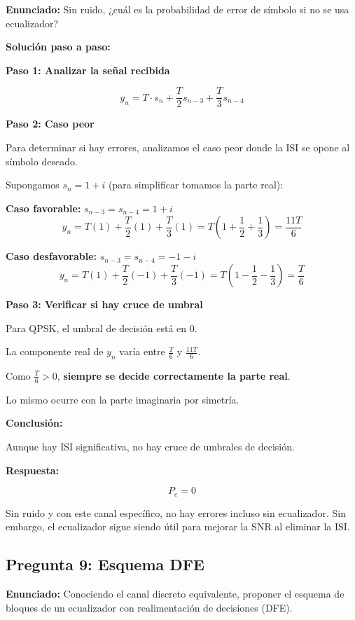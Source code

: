 \documentclass[11pt,a4paper]{article}
\begin{document}
\textbf{Enunciado:} Sin ruido, ¿cu\'al es la probabilidad de error de s\'imbolo si no se usa ecualizador?

\vspace{0.3cm}
\textbf{Soluci\'on paso a paso:}

\textbf{Paso 1: Analizar la se\~nal recibida}

\[
y_n = T \cdot s_n + \frac{T}{2} s_{n-3} + \frac{T}{3} s_{n-4}
\]

\textbf{Paso 2: Caso peor}

Para determinar si hay errores, analizamos el caso peor donde la ISI se opone al s\'imbolo deseado.

Supongamos $s_n = 1 + i$ (para simplificar tomamos la parte real):

\textbf{Caso favorable:} $s_{n-3} = s_{n-4} = 1 + i$
\[
y_n = T(1) + \frac{T}{2}(1) + \frac{T}{3}(1) = T\left(1 + \frac{1}{2} + \frac{1}{3}\right) = \frac{11T}{6}
\]

\textbf{Caso desfavorable:} $s_{n-3} = s_{n-4} = -1 - i$
\[
y_n = T(1) + \frac{T}{2}(-1) + \frac{T}{3}(-1) = T\left(1 - \frac{1}{2} - \frac{1}{3}\right) = \frac{T}{6}
\]

\textbf{Paso 3: Verificar si hay cruce de umbral}

Para QPSK, el umbral de decisi\'on est\'a en 0.

La componente real de $y_n$ var\'ia entre $\frac{T}{6}$ y $\frac{11T}{6}$.

Como $\frac{T}{6} > 0$, \textbf{siempre se decide correctamente la parte real}.

Lo mismo ocurre con la parte imaginaria por simetr\'ia.

\textbf{Conclusi\'on:}

Aunque hay ISI significativa, no hay cruce de umbrales de decisi\'on.

\textbf{Respuesta:}

\[
\boxed{P_e = 0}
\]

Sin ruido y con este canal espec\'ifico, no hay errores incluso sin ecualizador. Sin embargo, el ecualizador sigue siendo \'util para mejorar la SNR al eliminar la ISI.

\subsection*{Pregunta 9: Esquema DFE}

\textbf{Enunciado:} Conociendo el canal discreto equivalente, proponer el esquema de bloques de un ecualizador con realimentaci\'on de decisiones (DFE).
\end{document}
